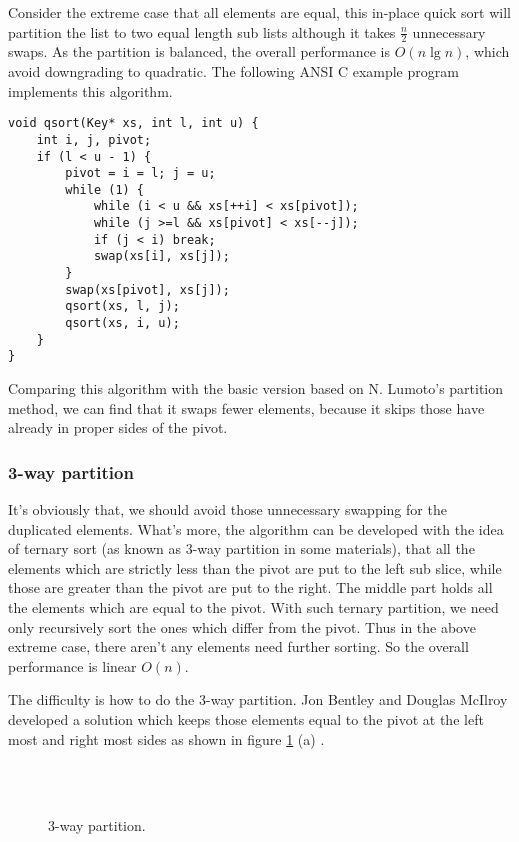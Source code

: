\documentclass[UTF8]{article}
\begin{document}
Consider the extreme case that all elements are equal, this in-place quick sort will partition
the list to two equal length sub lists although it takes $\frac{n}{2}$ unnecessary swaps.
As the partition is balanced, the overall performance is $O(n \lg n)$, which avoid downgrading
to quadratic. The following ANSI C example program implements this algorithm.

\lstset{language=C}
\begin{lstlisting}
void qsort(Key* xs, int l, int u) {
    int i, j, pivot;
    if (l < u - 1) {
        pivot = i = l; j = u;
        while (1) {
            while (i < u && xs[++i] < xs[pivot]);
            while (j >=l && xs[pivot] < xs[--j]);
            if (j < i) break;
            swap(xs[i], xs[j]);
        }
        swap(xs[pivot], xs[j]);
        qsort(xs, l, j);
        qsort(xs, i, u);
    }
}
\end{lstlisting}

Comparing this algorithm with the basic version based on N. Lumoto's partition method, we can find
that it swaps fewer elements, because it skips those have already in proper sides of the pivot.

\subsubsection{3-way partition}
It's obviously that, we should avoid those unnecessary swapping for the duplicated elements. What's more,
the algorithm can be developed with the idea of ternary sort (as known as 3-way partition in some
materials), that all the elements which are strictly less than the pivot are put to the left sub slice,
while those are greater than the pivot are put to the right. The middle part holds all the elements
which are equal to the pivot. With such ternary partition, we need only recursively sort the ones
which differ from the pivot. Thus in the above extreme case, there aren't any elements need further
sorting. So the overall performance is linear $O(n)$.

The difficulty is how to do the 3-way partition. Jon Bentley and Douglas McIlroy developed a solution
which keeps those elements equal to the pivot at the left most and right most sides as shown in
figure \ref{fig:partition-3-way} (a) \cite{3-way-part} \cite{opt-qs}.

\begin{figure}[htbp]
   \centering
    \\
    \\
   \caption{3-way partition.}
   \label{fig:partition-3-way}
\end{figure}
\end{document}
